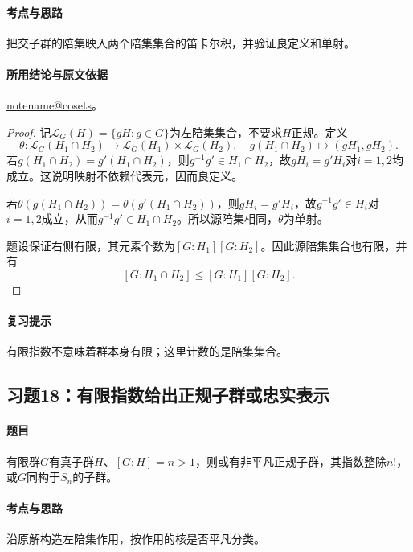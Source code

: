 \documentclass[UTF8,a4paper,11pt,fontset=windows]{ctexart}
\makeatletter
\newcommand{\noteref}[1]{\hyperref[note:#1]{\csname notename@#1\endcsname}}
\newcommand{\exref}[2]{\hyperref[ex:#1:#2]{第#1章习题#2}}
\makeatother
\begin{document}
\paragraph{考点与思路}
把交子群的陪集映入两个陪集集合的笛卡尔积，并验证良定义和单射。

\paragraph{所用结论与原文依据}
\noteref{cosets}。


\begin{proof}
记$\mathcal L_G(H)=\{gH:g\in G\}$为左陪集集合，不要求$H$正规。定义
\[
\theta:\mathcal L_G(H_1\cap H_2)\longrightarrow
\mathcal L_G(H_1)\times\mathcal L_G(H_2),\quad
g(H_1\cap H_2)\longmapsto(gH_1,gH_2).
\]
若$g(H_1\cap H_2)=g'(H_1\cap H_2)$，则$g^{-1}g'\in H_1\cap H_2$，故$gH_i=g'H_i$对$i=1,2$均成立。这说明映射不依赖代表元，因而良定义。

若$\theta(g(H_1\cap H_2))=\theta(g'(H_1\cap H_2))$，则$gH_i=g'H_i$，故$g^{-1}g'\in H_i$对$i=1,2$成立，从而$g^{-1}g'\in H_1\cap H_2$。所以源陪集相同，$\theta$为单射。

题设保证右侧有限，其元素个数为$[G:H_1][G:H_2]$。因此源陪集集合也有限，并有
\[
[G:H_1\cap H_2]\leq[G:H_1][G:H_2].
\]
\end{proof}

\paragraph{复习提示}
有限指数不意味着群本身有限；这里计数的是陪集集合。


\subsection{习题18：\texorpdfstring{有限指数给出正规子群或忠实表示}{有限指数给出正规子群或忠实表示}}
\label{ex:2:18}

\paragraph{题目}
有限群$G$有真子群$H$、$[G:H]=n>1$，则或有非平凡正规子群，其指数整除$n!$，或$G$同构于$S_n$的子群。

\paragraph{考点与思路}
沿原解构造左陪集作用，按作用的核是否平凡分类。
\end{document}
